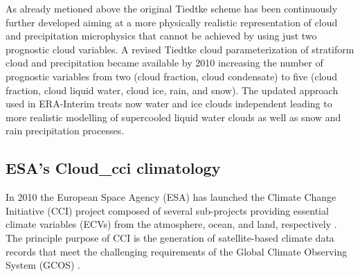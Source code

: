 As already metioned above the original Tiedtke scheme has been continuously further developed
aiming at a more physically realistic representation of cloud and precipitation microphysics
that cannot be achieved by using just two prognostic cloud variables.
A revised Tiedtke cloud parameterization of stratiform cloud and precipitation became available by 2010
increasing the number of prognostic variables from two (cloud fraction, cloud condensate) to five
(cloud fraction, cloud liquid water, cloud ice, rain, and snow).
The updated approach used in ERA-Interim treats now water and ice clouds independent leading to more realistic
modelling of supercooled liquid water clouds as well as snow and rain precipitation processes.





\subsection{ESA's Cloud\_cci climatology}\label{sec:cloudcci}
In 2010 the European Space Agency (ESA) has launched the Climate Change Initiative (CCI) project 
composed of several sub-projects providing essential climate variables (ECVs) from the
atmosphere, ocean, and land, respectively \cite{Hollmann2013}.
The principle purpose of CCI is the generation of satellite-based climate data records that
meet the challenging requirements of the Global Climate Observing System (GCOS) \cite{GCOS2011}.


